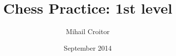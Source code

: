 \documentclass[a6paper]{book}
\title{Chess Practice: 1st level}
\author{Mihail Croitor}
\date{September 2014}
\begin{document}
\maketitle


\pagebreak


\smallbreak

\smallbreak

\smallbreak

\smallbreak

\smallbreak

\smallbreak

\smallbreak

\smallbreak


\pagebreak


\smallbreak

\smallbreak

\smallbreak

\smallbreak

\smallbreak


\pagebreak


\smallbreak

\smallbreak

\smallbreak

\smallbreak

\smallbreak

\smallbreak


\pagebreak


\smallbreak

\smallbreak


\pagebreak
{}
\fancyhead[RE,LO]{--}

\renewcommand{\labelenumi}{\bf{D.\arabic{enumi}}}
\begin{multicols}{2}



















\end{multicols}
\smallbreak
\begin{multicols}{2}


\end{multicols}
\end{document}
